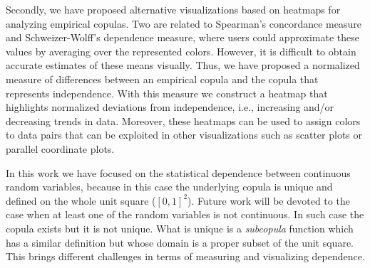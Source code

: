 \documentclass[journal]{vgtc}                %
\begin{document}
Secondly, we have proposed alternative visualizations based on heatmaps for analyzing empirical copulas. Two are related to Spearman's concordance measure and Schweizer-Wolff's dependence measure, where users could approximate these values by averaging over the represented colors. However, it is difficult to obtain accurate estimates of these means visually. Thus, we have proposed a normalized measure of differences between an empirical copula and the copula that represents independence. With this measure we construct a heatmap that highlights normalized deviations from independence, i.e., increasing and/or decreasing trends in data. Moreover, these heatmaps can be used to assign colors to data pairs that can be exploited in other visualizations such as scatter plots or parallel coordinate plots.

In this work we have focused on the statistical dependence between continuous random variables, because in this case the underlying copula is unique and defined on the whole unit square ($[0,1]^2$). Future work will be devoted to the case when at least one of the random variables is not continuous. In such case the copula exists but it is not unique. What is unique is a \textit{subcopula} function \cite{Erdely2017} which has a similar definition but whose domain is a proper subset of the unit square. This brings different challenges in terms of measuring and visualizing dependence. 


























%

%
%
%


\end{document}
